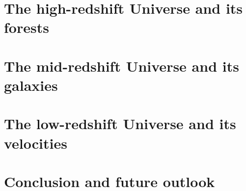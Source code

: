 \documentclass[english]{amu_these}
\begin{document}
	\chapter{ The high-redshift Universe and its forests }
	\label{chap:forests}
	

	\chapter{ The mid-redshift Universe and its galaxies }
	\label{chap:galaxies}
	

	\chapter{ The low-redshift Universe and its velocities }
	\label{chap:velocities}
	

	\chapter*{Conclusion and future outlook}
	

	\appendix

	\newpage
	\printbibliography[					%
	heading=bibintoc
	]	

	
	
\end{document}
